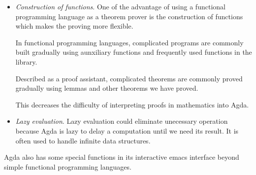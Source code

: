 \begin{itemize}
\item \textit{Construction of functions}. One of the advantage of using a functional programming language as a theorem prover is the construction of functions which makes the proving more flexible.

In functional programming languages, complicated programs are commonly built gradually using aunxiliary functions and frequently used functions in the library.

Described as a proof assistant, complicated theorems are commonly proved gradually using lemmas and other theorems we have proved.

This decreases the difficulty of interpreting proofs in mathematics into Agda.

\item \textit{Lazy evaluation}. Lazy evaluation could eliminate unecessary operation because Agda is lazy to delay a computation until we need its result. It is often used to handle infinite data structures. \cite{wiki:Lazy_evaluation}

\end{itemize}

Agda also has some special functions in its interactive emacs interface beyond simple functional programming languages.

